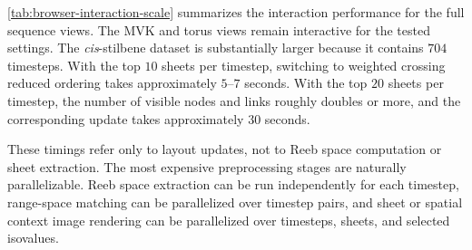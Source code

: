 \documentclass[review]{vgtc}
\begin{document}
\autoref{tab:browser-interaction-scale} summarizes the interaction performance for the full sequence views. The MVK and torus views remain interactive for the tested settings. The \textit{cis}-stilbene dataset is substantially larger because it contains $704$ timesteps. With the top $10$ sheets per timestep, switching to weighted crossing reduced ordering takes approximately $5$--$7$ seconds. With the top $20$ sheets per timestep, the number of visible nodes and links roughly doubles or more, and the corresponding update takes approximately $30$ seconds.

These timings refer only to layout updates, not to Reeb space computation or sheet extraction. The most expensive preprocessing stages are naturally parallelizable. Reeb space extraction can be run independently for each timestep, range-space matching can be parallelized over timestep pairs, and sheet or spatial context image rendering can be parallelized over timesteps, sheets, and selected isovalues.







%
%
\end{document}
